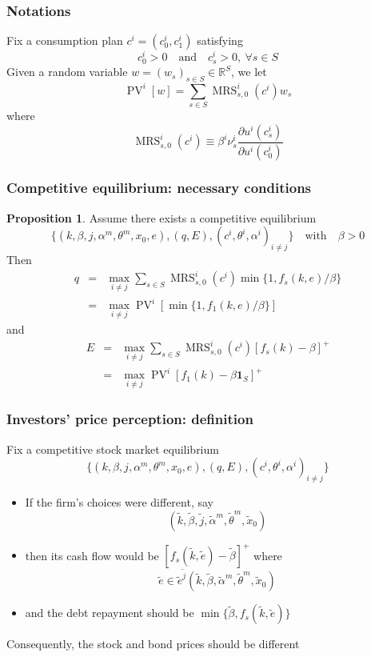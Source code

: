 \documentclass[blue]{beamer}
\DeclareMathOperator\PV{PV}
\def\R{\mathbb{R}}
\def\E{\PV}
\def\1{\mathbf{1}}
\def\et{\quad \textrm{and} \quad}
\DeclareMathOperator\MRS{MRS}
\theoremstyle{definition}
\theoremstyle{example}
\newtheorem*{proposition}{Proposition}
\begin{document}

\begin{frame}\frametitle{Notations}

Fix a consumption plan  $c^i=(c^i_0,c^i_1)$ satisfying
\[
c^i_0 >0 \et c^i_s >0, \ \forall s\in S
\]
Given a random variable $w=(w_s)_{s\in S} \in \R^S$, we let
\[
\E^i[w] = \sum_{s\in S} \MRS^i_{s,0}(c^i) w_s
\]
where
\[
\MRS^i_{s,0}(c^i) \equiv \beta^i \nu^i_s \frac{\partial u^i(c^i_s)}{\partial u^i(c^i_0)}
\]

\end{frame}


\begin{frame}\frametitle{Competitive equilibrium: necessary conditions}

\begin{proposition}
Assume there exists a competitive equilibrium
\[
\{(k,\beta,j,\alpha^m,\theta^m,x_0,e),(q,E),(c^i,\theta^i,\alpha^i)_{i\neq j}\} \quad \textrm{with} \quad \beta >0
\]
Then
\begin{eqnarray*}
q & = & \max_{i\neq j} \sum_{s\in S} \MRS^i_{s,0}(c^i) \min\{1,f_s(k,e)/\beta\} \\
& = & \max_{i\neq j} \E^i \left[ \min\{1,f_1(k,e)/\beta\} \right]
\end{eqnarray*}
and
\begin{eqnarray*}
E & = & \max_{i\neq j} \sum_{s\in S} \MRS^i_{s,0}(c^i) [f_s(k)-\beta]^+ \\
& = & \max_{i\neq j} \E^i  \left[  f_1(k)- \beta \1_S \right]^+
\end{eqnarray*}
\end{proposition}

\end{frame}



\begin{frame}\frametitle{Investors' price perception: definition}

Fix a competitive stock market equilibrium
\[
\{(k,\beta,j,\alpha^m,\theta^m,x_0,e),(q,E),(c^i,\theta^i,\alpha^i)_{i\neq j}\}
\]
\begin{itemize}
\item If the firm's choices were different, say
\[
(\tilde{k},\tilde{\beta},\tilde{j},\tilde{\alpha}^m,\tilde{\theta}^m,\tilde{x}_0)
\]
\item then its cash flow would be $[f_s(\tilde{k},\tilde{e}) - \tilde{\beta}]^+$ where
 \[
 \tilde{e} \in \tilde{e}^{\tilde{j}} (\tilde{k},\tilde{\beta},\tilde{\alpha}^m,\tilde{\theta}^m,\tilde{x}_0)
 \]
\item and the debt repayment should be $\min\{\tilde{\beta}, f_s(\tilde{k},\tilde{e})\}$
\end{itemize}

Consequently, the stock and bond prices should be different

\end{frame}
\end{document}
